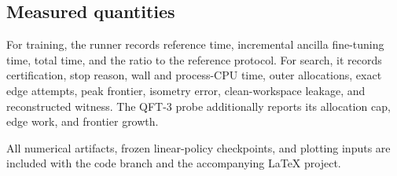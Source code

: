 \subsection{Measured quantities}

For training, the runner records reference time, incremental ancilla fine-tuning time, total time, and the ratio to the reference protocol. For search, it records certification, stop reason, wall and process-CPU time, outer allocations, exact edge attempts, peak frontier, isometry error, clean-workspace leakage, and reconstructed witness. The QFT-3 probe additionally reports its allocation cap, edge work, and frontier growth.

All numerical artifacts, frozen linear-policy checkpoints, and plotting inputs are included with the code branch and the accompanying LaTeX project.
